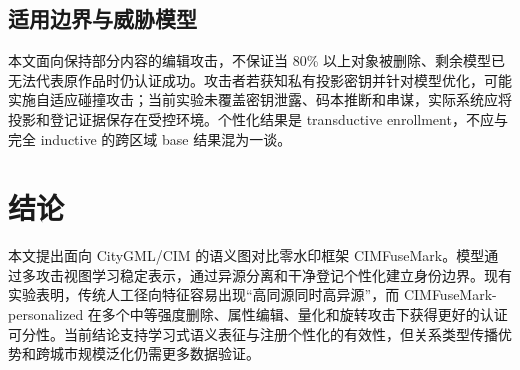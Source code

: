 \documentclass[UTF8,fontset=fandol,12pt]{ctexart}
\newcommand{\method}{CIMFuseMark}
\begin{document}
\subsection{适用边界与威胁模型}
本文面向保持部分内容的编辑攻击，不保证当 80\% 以上对象被删除、剩余模型已无法代表原作品时仍认证成功。攻击者若获知私有投影密钥并针对模型优化，可能实施自适应碰撞攻击；当前实验未覆盖密钥泄露、码本推断和串谋，实际系统应将投影和登记证据保存在受控环境。个性化结果是 transductive enrollment，不应与完全 inductive 的跨区域 base 结果混为一谈。

\section{结论}
本文提出面向 CityGML/CIM 的语义图对比零水印框架 \method。模型通过多攻击视图学习稳定表示，通过异源分离和干净登记个性化建立身份边界。现有实验表明，传统人工径向特征容易出现“高同源同时高异源”，而 \method-personalized 在多个中等强度删除、属性编辑、量化和旋转攻击下获得更好的认证可分性。当前结论支持学习式语义表征与注册个性化的有效性，但关系类型传播优势和跨城市规模泛化仍需更多数据验证。



\end{document}

